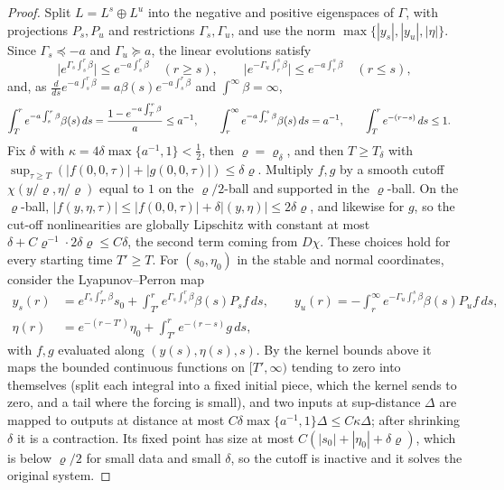 \documentclass{article} %
\theoremstyle{plain}
\theoremstyle{definition}
\theoremstyle{remark}
\begin{document}
\begin{proof}
Split $L=L^s\oplus L^u$ into the negative and positive eigenspaces of $\Gamma$, with projections
$P_s,P_u$ and restrictions $\Gamma_s,\Gamma_u$, and use the norm $\max\{|y_s|,|y_u|,|\eta|\}$. Since
$\Gamma_s\preceq-a$ and $\Gamma_u\succeq a$, the linear evolutions satisfy
\[
\bigl|e^{\Gamma_s\int_s^r\beta}\bigr|\le e^{-a\int_s^r\beta}\quad(r\ge s),\qquad
\bigl|e^{-\Gamma_u\int_r^s\beta}\bigr|\le e^{-a\int_r^s\beta}\quad(r\le s),
\]
and, as $\frac{d}{ds}e^{-a\int_s^r\beta}=a\beta(s)e^{-a\int_s^r\beta}$ and $\int^\infty\beta=\infty$,
\begin{align*}
\int_T^re^{-a\int_s^r\beta}\beta(s)\,ds&=\frac{1-e^{-a\int_T^r\beta}}{a}\le a^{-1},\qquad
\int_r^\infty e^{-a\int_r^s\beta}\beta(s)\,ds=a^{-1},\qquad
\int_T^re^{-(r-s)}\,ds\le1 .
\end{align*}
Fix $\delta$ with $\kappa=4\delta\max\{a^{-1},1\}<\tfrac12$, then $\varrho=\varrho_\delta$, and
then $T\ge T_\delta$ with $\sup_{\tau\ge T}(|f(0,0,\tau)|+|g(0,0,\tau)|)\le\delta\varrho$.
Multiply $f,g$ by a smooth cutoff $\chi(y/\varrho,\eta/\varrho)$ equal to $1$ on the
$\varrho/2$-ball and supported in the $\varrho$-ball. On the $\varrho$-ball,
$|f(y,\eta,\tau)|\le|f(0,0,\tau)|+\delta|(y,\eta)|\le2\delta\varrho$, and likewise for $g$, so
the cut-off nonlinearities are globally Lipschitz with constant at most
$\delta+C\varrho^{-1}\cdot2\delta\varrho\le C\delta$, the second term coming from $D\chi$.
These choices hold for every starting time $T'\ge T$. For $(s_0,\eta_0)$ in the stable and normal
coordinates, consider the Lyapunov--Perron map
\begin{align*}
y_s(r)&=e^{\Gamma_s\int_{T'}^r\beta}s_0+\int_{T'}^re^{\Gamma_s\int_s^r\beta}\beta(s)P_sf\,ds,\qquad
y_u(r)=-\int_r^\infty e^{-\Gamma_u\int_r^s\beta}\beta(s)P_uf\,ds,\\
\eta(r)&=e^{-(r-T')}\eta_0+\int_{T'}^re^{-(r-s)}g\,ds ,
\end{align*}
with $f,g$ evaluated along $(y(s),\eta(s),s)$. By the kernel bounds above it maps the bounded
continuous functions on $[T',\infty)$ tending to zero into themselves (split each integral into a
fixed initial piece, which the kernel sends to zero, and a tail where the forcing is small), and two
inputs at sup-distance $\Delta$ are mapped to outputs at distance at most
$C\delta\max\{a^{-1},1\}\Delta\le C\kappa\Delta$; after shrinking $\delta$ it is a contraction. Its
fixed point has size at most $C(|s_0|+|\eta_0|+\delta\varrho)$, which is below $\varrho/2$
for small data and small $\delta$, so the cutoff is inactive and it solves the original system.

\end{proof}
\end{document}
